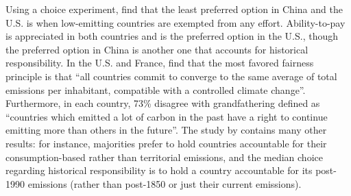 Using a choice experiment, \citet{carlsson_fair_2013} find that the least preferred option in China and the U.S. is when low-emitting countries are exempted from any effort. Ability-to-pay is appreciated in both countries and is the preferred option in the U.S., though the preferred option in China is another one that accounts for historical responsibility. %
In the U.S. and France, \citet{meilland_international_2023} find that the most favored fairness principle is that ``all countries commit to converge to the same average of total emissions per inhabitant, compatible with a controlled climate change''. Furthermore, in each country, 73\% disagree with grandfathering defined as ``countries which emitted a lot of carbon in the past have a right to continue emitting more than others in the future''. The study by \citet{meilland_international_2023} contains many other results: for instance, majorities prefer to hold countries accountable for their consumption-based rather than territorial emissions, and the median choice regarding historical responsibility is to hold a country accountable for its post-1990 emissions (rather than post-1850 or just their current emissions). 
